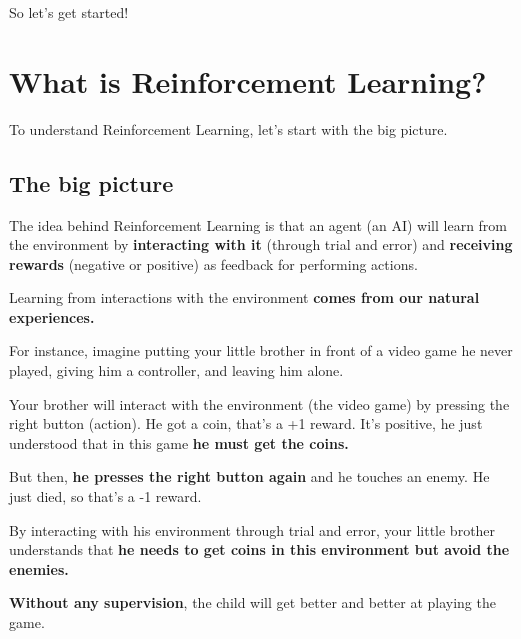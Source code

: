 \documentclass[11pt,a4paper]{article}
\begin{document}

So let's get started!

\section{What is Reinforcement Learning?}\label{what-is-reinforcement-learning}

To understand Reinforcement Learning, let's start with the big picture.

\subsection{The big picture}\label{the-big-picture}

The idea behind Reinforcement Learning is that an agent (an AI) will learn from the environment by \textbf{interacting with it} (through trial and error) and \textbf{receiving rewards} (negative or positive) as feedback for performing actions.

Learning from interactions with the environment \textbf{comes from our natural experiences.}

For instance, imagine putting your little brother in front of a video game he never played, giving him a controller, and leaving him alone.


Your brother will interact with the environment (the video game) by pressing the right button (action). He got a coin, that's a +1 reward. It's positive, he just understood that in this game \textbf{he must get the coins.}


But then, \textbf{he presses the right button again} and he touches an enemy. He just died, so that's a -1 reward.


By interacting with his environment through trial and error, your little brother understands that \textbf{he needs to get coins in this environment but avoid the enemies.}

\textbf{Without any supervision}, the child will get better and better at playing the game.
\end{document}
